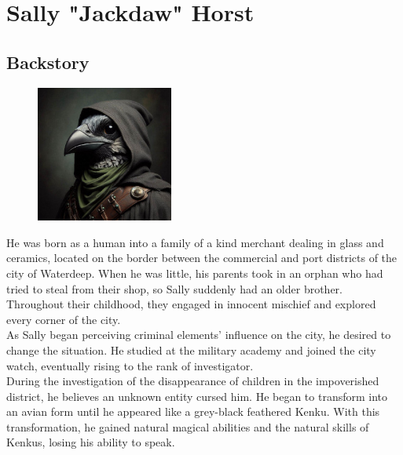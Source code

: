 \documentclass[10pt,twocolumn,twoside,openany,bg=full,layout=true,nomultitoc]{dndbook}
\begin{document}
\newpage


  \section{Sally "Jackdaw" Horst}\label{sec:sally-jackdaw-horst}
  \subsection{Backstory}\label{subsec:sally-backstory}
  \begin{figure}
    \begin{center}
      \includegraphics[width=0.4\textwidth]{img/sally}
      \vspace{1cm}
    \end{center}
  \end{figure}

He was born as a human into a family of a kind merchant dealing in glass and ceramics, located on the border between the
commercial and port districts of the city of Waterdeep.
When he was little, his parents took in an orphan who had tried to steal from their shop, so Sally suddenly had an
older brother.
Throughout their childhood, they engaged in innocent mischief and explored every corner of the city.\\

As Sally began perceiving criminal elements' influence on the city, he desired to change the situation.
He studied at the military academy and joined the city watch, eventually rising to the rank of investigator.\\

During the investigation of the disappearance of children in the impoverished district, he believes an unknown entity
cursed him.
He began to transform into an avian form until he appeared like a grey-black feathered Kenku.
With this transformation, he gained natural magical abilities and the natural skills of Kenkus, losing his ability
to speak.\\
\end{document}
